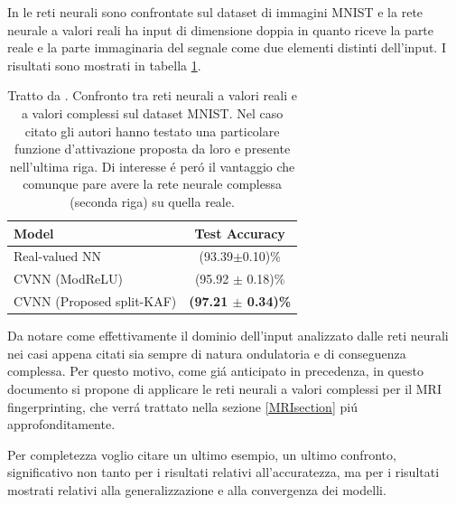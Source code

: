 \documentclass[a4paper,12pt]{report}
\begin{document}
 In \cite{scardapane2018complex} le reti neurali sono confrontate sul dataset di immagini MNIST e la rete neurale a valori reali ha input di dimensione doppia in quanto riceve la parte reale e la parte immaginaria del segnale come due elementi distinti dell'input. I risultati sono mostrati in tabella \ref{MNISTTab}.
 \begin{table}[h]
  \centering
  \begin{tabular}{l c}
   \hline
   Model & Test Accuracy\\
   \hline
   Real-valued NN & (93.39$\pm$0.10)\% \\
   \hline
   CVNN (ModReLU) & (95.92 $\pm$ 0.18)\% \\
   \hline
   CVNN (Proposed split-KAF) & \textbf{(97.21 $\pm$ 0.34)\%}\\
   \hline
  \end{tabular}
  \caption{Tratto da \cite{scardapane2018complex}. Confronto tra reti neurali a valori reali e a valori complessi sul dataset MNIST. Nel caso citato gli autori hanno testato una particolare funzione d'attivazione proposta da loro e presente nell'ultima riga. Di interesse \'e per\'o il vantaggio che comunque pare avere la rete neurale complessa (seconda riga) su quella reale.}
  \label{MNISTTab}
 \end{table}
 
  
 Da notare come effettivamente il dominio dell'input analizzato dalle reti neurali nei casi appena citati sia sempre di natura ondulatoria e di conseguenza complessa. 
 Per questo motivo, come gi\'a anticipato in precedenza, in questo documento si propone di applicare le reti neurali a valori complessi per il MRI fingerprinting, che verr\'a trattato nella sezione \ref{MRIsection} pi\'u approfonditamente. 
 
 
 Per completezza voglio citare un ultimo esempio, un ultimo confronto, significativo non tanto per i risultati relativi all'accuratezza, ma per i risultati mostrati relativi alla generalizzazione e alla convergenza dei modelli.
 
\end{document}
